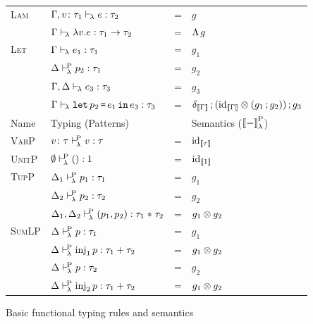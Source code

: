 \documentclass[runningheads,envcountsame]{llncs}
\begin{document}
\begin{figure}
{\begin{tabular}{l|l c l}
            \\ \hline
              \multirow{2}{*}{\textsc{Lam}}
            & $\Gamma, v\colon \tau_1 \vdash_{\!\lambda} e : \tau_2$
            & = & $g$ \\ \cline{2-2}
            & $\typerulel{\Gamma}{\elam{v}{e}}{\tfun{\tau_1}{\tau_2}}$
            & = & $\curry\,g$
            \\ \hline
              \multirow{3}{*}{\textsc{Let}}
            & $\Gamma \vdash_{\!\lambda} e_1 : \tau_1$
            & = & $g_1$ \\
            & $\Delta \vdash^{\!\mathrm{P}}_{\!\lambda} p_2 : \tau_1$
            & = & $g_2$ \\
            & $\Gamma,\Delta \vdash_{\!\lambda} e_3 : \tau_3$
            & = & $g_3$ \\ \cline{2-2}
            & $\Gamma \vdash_{\!\lambda} \texttt{let}\,p_2\,\texttt{=}\,e_1\,\texttt{in}\,e_3 : \tau_3$
            & = & $\comp{\comp{\dup_{\sem{\Gamma}}}{(\tensor{\id_{\sem{\Gamma}}}{(\comp{g_1}{g_2})})}}{g_3}$
            \\ \hline \hline
            Name & Typing (Patterns) & & Semantics ($\semLP{-}$) \\ \hline
              \textsc{VarP}
            & $v\colon \tau \vdash^{\!\mathrm{P}}_{\!\lambda} v : \tau$
            & = & $\id_{\sem{\tau}}$ 
            \\ \hline
              \textsc{UnitP}
            & $\emptyset \vdash^{\!\mathrm{P}}_{\!\lambda} () : 1$
            & = & $\id_{\sem{\tunit}}$ 
            \\ \hline
              \multirow{3}{*}{\textsc{TupP}}
            & $\Delta_1 \vdash^{\!\mathrm{P}}_{\!\lambda} p_1 : \tau_1$
            & = & $g_1$ \\
            & $\Delta_2 \vdash^{\!\mathrm{P}}_{\!\lambda} p_2 : \tau_2$
            & = & $g_2$ \\ \cline{2-2}
            & $\Delta_1, \Delta_2 \vdash^{\!\mathrm{P}}_{\!\lambda} (p_1, p_2) : \tau_1 \mathrel{*} \tau_2$
            & = & $\tensor{g_1}{g_2}$ 
            \\ \hline
              \multirow{3}{*}{\textsc{SumLP}}
            & $\Delta \vdash^{\!\mathrm{P}}_{\!\lambda} p : \tau_1$
            & = & $g_1$ \\
            & $\Delta \vdash^{\!\mathrm{P}}_{\!\lambda} \mathrm{inj}_1\,p : \tau_1 + \tau_2$
            & = & $\tensor{g_1}{g_2}$ 
            \\ \hline
              \multirow{3}{*}{\textsc{SumRP}}
            & $\Delta \vdash^{\!\mathrm{P}}_{\!\lambda} p : \tau_2$
            & = & $g_2$ \\
            & $\Delta \vdash^{\!\mathrm{P}}_{\!\lambda} \mathrm{inj}_2\,p : \tau_1 + \tau_2$
            & = & $\tensor{g_1}{g_2}$ 
            \\ \hline
        \end{tabular}}
        \caption{Basic functional typing rules and semantics}
        \label{fig:semantics1}
    \end{figure}
    
\end{document}
